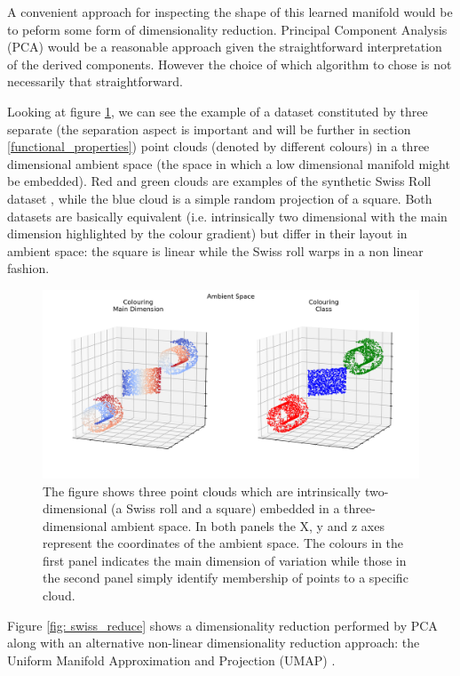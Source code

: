 A convenient approach for inspecting the shape of this learned manifold would be to peform some form of dimensionality reduction. Principal Component Analysis (PCA) \cite{pearson1901liii} would be a reasonable approach given the straightforward interpretation of the derived components. However the choice of which algorithm to chose is not necessarily that straightforward. 

Looking at figure \ref{fig: swiss_ambient}, we can see the example of a dataset constituted by three separate (the separation aspect is important and will be further in section \ref{functional_properties}) point clouds (denoted by different colours) in a three dimensional ambient space (the space in which a low dimensional manifold might be embedded). Red and green clouds are examples of the synthetic Swiss Roll dataset \cite{scikit-learn}, while the blue cloud is a simple random projection of a square. Both datasets are basically equivalent (i.e. intrinsically two dimensional with the main dimension highlighted by the colour gradient) but differ in their layout in ambient space: the square is linear while the Swiss roll warps in a non linear fashion.

\begin{figure}[!htb]
  \centering
  \includegraphics[width=\textwidth]{images/chapter_4/ambient.png}
    \caption[\textbf{Swiss rolls and square in ambient space}]{The figure shows three point clouds which are intrinsically two-dimensional (a Swiss roll and a square) embedded in a three-dimensional ambient space. In both panels the X, y and z axes represent the coordinates of the ambient space. The colours in the first panel indicates the main dimension of variation while those in the second panel simply identify membership of points to a specific cloud.}
    \label{fig: swiss_ambient}
\end{figure}

Figure \ref{fig: swiss_reduce} shows a dimensionality reduction performed by PCA along with an alternative non-linear dimensionality reduction approach: the Uniform Manifold Approximation and Projection (UMAP) \cite{2018arXivUMAP}. 

